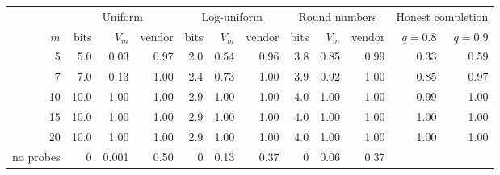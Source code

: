 \begin{tabular}{@{}r rrr rrr rrr rr@{}}
\toprule
& \multicolumn{3}{c}{Uniform} & \multicolumn{3}{c}{Log-uniform} & \multicolumn{3}{c}{Round numbers} & \multicolumn{2}{c}{Honest completion} \\
\cmidrule(lr){2-4}\cmidrule(lr){5-7}\cmidrule(lr){8-10}\cmidrule(l){11-12}
$m$ & bits & $V_m$ & vendor & bits & $V_m$ & vendor & bits & $V_m$ & vendor & $q{=}0.8$ & $q{=}0.9$ \\
\midrule
5 & 5.0 & 0.03 & 0.97 & 2.0 & 0.54 & 0.96 & 3.8 & 0.85 & 0.99 & 0.33 & 0.59 \\
7 & 7.0 & 0.13 & 1.00 & 2.4 & 0.73 & 1.00 & 3.9 & 0.92 & 1.00 & 0.85 & 0.97 \\
10 & 10.0 & 1.00 & 1.00 & 2.9 & 1.00 & 1.00 & 4.0 & 1.00 & 1.00 & 0.99 & 1.00 \\
15 & 10.0 & 1.00 & 1.00 & 2.9 & 1.00 & 1.00 & 4.0 & 1.00 & 1.00 & 1.00 & 1.00 \\
20 & 10.0 & 1.00 & 1.00 & 2.9 & 1.00 & 1.00 & 4.0 & 1.00 & 1.00 & 1.00 & 1.00 \\
\midrule
no probes & 0 & 0.001 & 0.50 & 0 & 0.13 & 0.37 & 0 & 0.06 & 0.37 & & \\
\bottomrule
\end{tabular}
